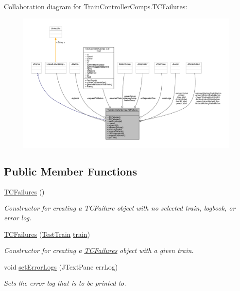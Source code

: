 Collaboration diagram for Train\+Controller\+Comps.\+T\+C\+Failures\+:
\nopagebreak
\begin{figure}[H]
\begin{center}
\leavevmode
\includegraphics[width=350pt]{classTrainControllerComps_1_1TCFailures__coll__graph}
\end{center}
\end{figure}
\subsection*{Public Member Functions}
\begin{DoxyCompactItemize}
\item 
\hyperlink{classTrainControllerComps_1_1TCFailures_afbf09a8c516634c2376901ca04bebae9}{T\+C\+Failures} ()
\begin{DoxyCompactList}\small\item\em Constructor for creating a T\+C\+Failure object with no selected train, logbook, or error log. \end{DoxyCompactList}\item 
\hyperlink{classTrainControllerComps_1_1TCFailures_a021613d630232111e9a30398d15dcd51}{T\+C\+Failures} (\hyperlink{classTrainControllerComps_1_1TestTrain}{Test\+Train} \hyperlink{classtrain}{train})
\begin{DoxyCompactList}\small\item\em Constructor for creating a \hyperlink{classTrainControllerComps_1_1TCFailures}{T\+C\+Failures} object with a given train. \end{DoxyCompactList}\item 
void \hyperlink{classTrainControllerComps_1_1TCFailures_a9ce6a8fde30a39507e3ee5dfb1a02ba3}{set\+Error\+Logs} (J\+Text\+Pane err\+Log)
\begin{DoxyCompactList}\small\item\em Sets the error log that is to be printed to. \end{DoxyCompactList}\end{DoxyCompactItemize}
